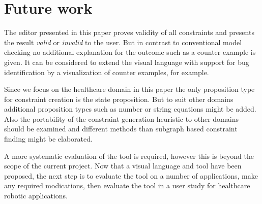 \documentclass[conference]{IEEEtran}
\begin{document}



\section{Future work}

The editor presented in this paper proves validity of all constraints and presents the result \emph{valid} or \emph{invalid} to the user. But in contrast to conventional model checking no additional explanation for the outcome such as a counter example is given. It can be considered to extend the visual language with support for bug identification by a visualization of counter examples, for example.




Since we focus on the healthcare domain in this paper the only proposition type for constraint creation is the state proposition. But to suit other domains additional proposition types such as number or string equations might be added. Also the portability of the constraint generation heuristic to other domains should be examined and different methods than subgraph based constraint finding might be elaborated.


A more systematic evaluation of the tool is required, however this is beyond the scope of the current project. Now that a visual language and tool have been proposed, the next step is to evaluate the tool on a number of applications, make any required modications, then evaluate the tool in a user study for healthcare robotic applications. 	
\end{document}
